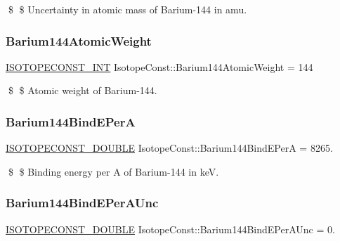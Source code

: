 \$ \$ Uncertainty in atomic mass of Barium-\/144 in amu. \mbox{\label{group___isotope_const-_barium-_ba144_ga4a595ef46c09b9f3fe3b41f85c3c7d67}} 
\subsubsection{\texorpdfstring{Barium144\+Atomic\+Weight}{Barium144AtomicWeight}}
{\footnotesize\ttfamily \mbox{\hyperlink{group___isotope_const-_macros_ga5f18360b3e99483a35c32d789e62621c}{I\+S\+O\+T\+O\+P\+E\+C\+O\+N\+S\+T\+\_\+\+I\+NT}} Isotope\+Const\+::\+Barium144\+Atomic\+Weight = 144}

\$ \$ Atomic weight of Barium-\/144. \mbox{\label{group___isotope_const-_barium-_ba144_ga506dea7cb739ba07c66b3c5270764842}} 
\subsubsection{\texorpdfstring{Barium144\+Bind\+E\+PerA}{Barium144BindEPerA}}
{\footnotesize\ttfamily \mbox{\hyperlink{group___isotope_const-_macros_ga8f45a7272ce02c0b4c65c44636ed719a}{I\+S\+O\+T\+O\+P\+E\+C\+O\+N\+S\+T\+\_\+\+D\+O\+U\+B\+LE}} Isotope\+Const\+::\+Barium144\+Bind\+E\+PerA = 8265.}

\$ \$ Binding energy per A of Barium-\/144 in keV. \mbox{\label{group___isotope_const-_barium-_ba144_gab5b0af9553cbd5a1d3157dbc18aa47ff}} 
\subsubsection{\texorpdfstring{Barium144\+Bind\+E\+Per\+A\+Unc}{Barium144BindEPerAUnc}}
{\footnotesize\ttfamily \mbox{\hyperlink{group___isotope_const-_macros_ga8f45a7272ce02c0b4c65c44636ed719a}{I\+S\+O\+T\+O\+P\+E\+C\+O\+N\+S\+T\+\_\+\+D\+O\+U\+B\+LE}} Isotope\+Const\+::\+Barium144\+Bind\+E\+Per\+A\+Unc = 0.}

